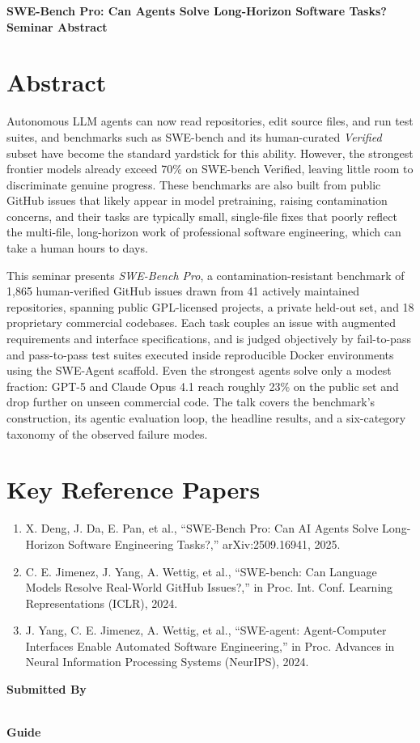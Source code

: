\documentclass[11pt]{article}
\begin{document}
\begin{center}
{\LARGE\bfseries SWE-Bench Pro: Can Agents Solve Long-Horizon Software Tasks?}\\[1.1em]
{\large\bfseries Seminar Abstract}\\[0.6em]
{\normalsize \seminarDate}
\end{center}
\vspace{0.6em}
\section*{Abstract}
Autonomous LLM agents can now read repositories, edit source files, and run test suites, and benchmarks such as SWE-bench and its human-curated \emph{Verified} subset have become the standard yardstick for this ability. However, the strongest frontier models already exceed 70\% on SWE-bench Verified, leaving little room to discriminate genuine progress. These benchmarks are also built from public GitHub issues that likely appear in model pretraining, raising contamination concerns, and their tasks are typically small, single-file fixes that poorly reflect the multi-file, long-horizon work of professional software engineering, which can take a human hours to days.

This seminar presents \emph{SWE-Bench Pro}, a contamination-resistant benchmark of 1,865 human-verified GitHub issues drawn from 41 actively maintained repositories, spanning public GPL-licensed projects, a private held-out set, and 18 proprietary commercial codebases. Each task couples an issue with augmented requirements and interface specifications, and is judged objectively by fail-to-pass and pass-to-pass test suites executed inside reproducible Docker environments using the SWE-Agent scaffold. Even the strongest agents solve only a modest fraction: GPT-5 and Claude Opus 4.1 reach roughly 23\% on the public set and drop further on unseen commercial code. The talk covers the benchmark's construction, its agentic evaluation loop, the headline results, and a six-category taxonomy of the observed failure modes.
\section*{Key Reference Papers}
\begin{enumerate}
  \item X. Deng, J. Da, E. Pan, et al., ``SWE-Bench Pro: Can AI Agents Solve Long-Horizon Software Engineering Tasks?,'' arXiv:2509.16941, 2025.
  \item C. E. Jimenez, J. Yang, A. Wettig, et al., ``SWE-bench: Can Language Models Resolve Real-World GitHub Issues?,'' in Proc. Int. Conf. Learning Representations (ICLR), 2024.
  \item J. Yang, C. E. Jimenez, A. Wettig, et al., ``SWE-agent: Agent-Computer Interfaces Enable Automated Software Engineering,'' in Proc. Advances in Neural Information Processing Systems (NeurIPS), 2024.
\end{enumerate}
\vspace{0.8em}
\noindent\textbf{Submitted By}\\
\seminarName\\
\seminarRoll

\vspace{0.6em}
\noindent\textbf{Guide}\\
\seminarGuide
\end{document}
